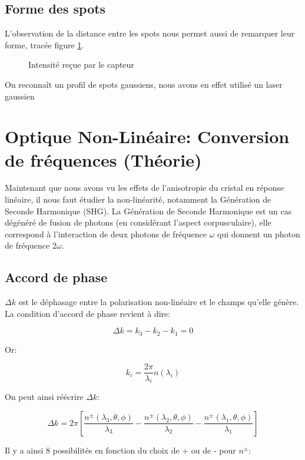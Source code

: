 \documentclass[a4paper,11pt]{report}
\begin{document}
\section{Forme des spots}
L'observation de la distance entre les spots nous permet aussi de remarquer leur forme, tracée figure \ref{formespots}.
\begin{figure}[h]
    \begin{center}
        \caption{Intensité reçue par le capteur}
        \label{formespots}
    \end{center}
\end{figure}
On reconnaît un profil de spots gaussiens, nous avons en effet utilisé un laser gaussien

\chapter{Optique Non-Linéaire: Conversion de fréquences (Théorie)}\label{ONLTheorie}

Maintenant que nous avons vu les effets de l'anisotropie du cristal en réponse linéaire, il nous faut étudier la non-linéarité, notamment la Génération de Seconde Harmonique (SHG). La Génération de Seconde Harmonique est un cas dégénéré de fusion de photons (en considérant l'aspect corpusculaire), elle correspond à l'interaction de deux photons de fréquence $\omega$ qui donnent un photon de fréquence 2$\omega$.

\section{Accord de phase}


$\Delta k$ est le déphasage entre la polarisation non-linéaire et le champs qu'elle génère. La condition d'accord de phase revient à dire:

\[\Delta k=k_3-k_2-k_1=0\]

Or:

\[k_i=\dfrac{2\pi}{\lambda_i}n(\lambda_i)\]

On peut ainsi réécrire $\Delta k$:

\[\Delta k=2\pi\left[\dfrac{n^{\pm}(\lambda_3,\theta,\phi)}{\lambda_3}-\dfrac{n^{\pm}(\lambda_2,\theta,\phi)}{\lambda_2}-\dfrac{n^{\pm}(\lambda_1,\theta,\phi)}{\lambda_1}\right]\]

Il y a ainsi 8 possibilités en fonction du choix de + ou de - pour $n^{\pm}$:
\end{document}
